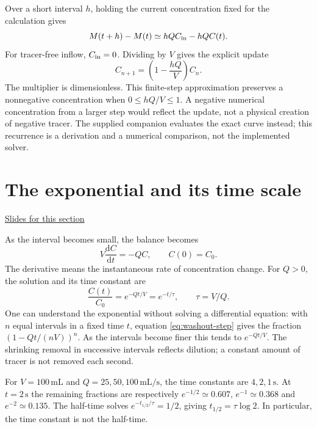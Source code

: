 \documentclass[11pt,letterpaper]{article}
\theoremstyle{definition}\newtheorem{definition}{Definition}\newtheorem{example}{Example}
\numberwithin{equation}{section}
\begin{document}
Over a short interval $h$, holding the current concentration fixed for the calculation gives
\begin{equation}M(t+h)-M(t)\simeq hQ C_{\rm in}-hQ C(t).
\end{equation}
For tracer-free inflow, $C_{\rm in}=0$. Dividing by $V$ gives the explicit update
\begin{equation}C_{n+1}=\left(1-\frac{hQ}{V}\right)C_n.\label{eq:washout-step}\end{equation}
The multiplier is dimensionless. This finite-step approximation preserves a nonnegative concentration when $0\leq hQ/V\leq1$. A negative numerical concentration from a larger step would reflect the update, not a physical creation of negative tracer. The supplied companion evaluates the exact curve instead; this recurrence is a derivation and a numerical comparison, not the implemented solver.
\section{The exponential and its time scale}
\hypertarget{note-the-exponential-and-its-time-scale}{}\label{note:the-exponential-and-its-time-scale}
{\small \href{slides.html\#frame=repeated-removal-gives-an-exponential\&step=1}{Slides for this section}}\par
As the interval becomes small, the balance becomes
\begin{equation}V\frac{\mathrm dC}{\mathrm dt}=-QC,\qquad C(0)=C_0.
\end{equation}
The derivative means the instantaneous rate of concentration change. For $Q>0$, the solution and its time constant are
\begin{equation}\frac{C(t)}{C_0}=e^{-Qt/V}=e^{-t/\tau},\qquad \tau=V/Q.\label{eq:washout-exact}\end{equation}
One can understand the exponential without solving a differential equation: with $n$ equal intervals in a fixed time $t$, equation \eqref{eq:washout-step} gives the fraction $(1-Qt/(nV))^n$. As the intervals become finer this tends to $e^{-Qt/V}$. The shrinking removal in successive intervals reflects dilution; a constant amount of tracer is not removed each second.

For $V=100\,\mathrm{mL}$ and $Q=25,50,100\,\mathrm{mL/s}$, the time constants are $4,2,1\,\mathrm{s}$. At $t=2\,\mathrm{s}$ the remaining fractions are respectively $e^{-1/2}\simeq0.607$, $e^{-1}\simeq0.368$ and $e^{-2}\simeq0.135$. The half-time solves $e^{-t_{1/2}/\tau}=1/2$, giving $t_{1/2}=\tau\log2$. In particular, the time constant is not the half-time.
\end{document}
